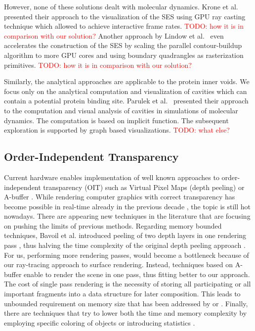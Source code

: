However, none of these solutions dealt with molecular dynamics. 
Krone et al.~\cite{krone2009interactive} presented their approach to the visualization of the SES using GPU ray casting technique which allowed to achieve interactive frame rates. \textcolor{red}{TODO: how it is in comparison with our solution?} 
Another approach by Lindow et al.~\cite{lindow2010accelerated} even accelerates the construction of the SES by scaling the parallel contour-buildup algorithm to more GPU cores and using boundary quadrangles as rasterization primitives. \textcolor{red}{TODO: how it is in comparison with our solution?}

Similarly, the analytical approaches are applicable to the protein inner voids. 
We focus only on the analytical computation and visualization of cavities which can contain a potential protein binding site.
Parulek et al.~\cite{parulek2013visual} presented their approach to the computation and visual analysis of cavities in simulations of molecular dynamics.
The computation is based on implicit function. 
The subsequent exploration is supported by graph based visualizations.
\textcolor{red}{TODO: what else?}


\subsection{Order-Independent Transparency}
Current hardware enables implementation of well known approaches to order-independent transparency (OIT) such as Virtual Pixel Maps (depth peeling) \cite{mammen1989transparency} or A-buffer \cite{carpenter1984abuffer}.
While rendering computer graphics with correct transparency has become possible in real-time already in the previous decade \cite{everitt2001interactive}, the topic is still hot nowadays.
There are appearing new techniques in the literature that are focusing on pushing the limits of previous methods.
Regarding memory bounded techniques, Bavoil et al. introduced peeling of two depth layers in one rendering pass \cite{bavoil2008order}, thus halving the time complexity of the original depth peeling approach \cite{everitt2001interactive}.
For us, performing more rendering passes, would become a bottleneck because of our ray-tracing approach to surface rendering.
Instead, techniques based on A-buffer enable to render the scene in one pass, thus fitting better to our approach.
The cost of single pass rendering is the necessity of storing all participating \cite{yang2010real} or all important \cite{salvi2011adaptive} fragments into a data structure for later composition.
This leads to unbounded requirement on memory size that has been addressed by \cite{maule2012memory} or \cite{vasilakis2015k+buffer}.
Finally, there are techniques that try to lower both the time and memory complexity by employing specific coloring of objects \cite{mcguire2013weighted} or introducing statistics \cite{enderton2011stochastic}.

